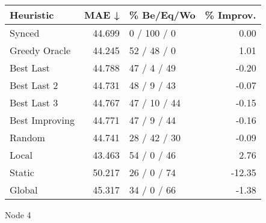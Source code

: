 \begin{tabular}{lrlr}
\toprule
\textbf{Heuristic} & \textbf{MAE ↓} & \textbf{\% Be/Eq/Wo} & \textbf{\% Improv.} \\
\midrule
            Synced &         44.699 &          0 / 100 / 0 &                0.00 \\
     Greedy Oracle &         44.245 &          52 / 48 / 0 &                1.01 \\
         Best Last &         44.788 &          47 / 4 / 49 &               -0.20 \\
       Best Last 2 &         44.731 &          48 / 9 / 43 &               -0.07 \\
       Best Last 3 &         44.767 &         47 / 10 / 44 &               -0.15 \\
    Best Improving &         44.771 &          47 / 9 / 44 &               -0.16 \\
            Random &         44.741 &         28 / 42 / 30 &               -0.09 \\
             Local &         43.463 &          54 / 0 / 46 &                2.76 \\
            Static &         50.217 &          26 / 0 / 74 &              -12.35 \\
            Global &         45.317 &          34 / 0 / 66 &               -1.38 \\
\bottomrule
\end{tabular}
\caption{Node 4}
\label{tab:non_lr01_le2_bs2_4}
